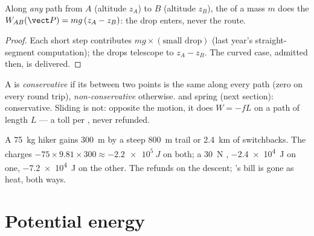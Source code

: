 \begin{proposition}\label{prop:g12:work-and-energy:weight}
Along \emph{any} path from $A$ (altitude $z_A$) to $B$ (altitude
$z_B$), the  of a mass $m$ does the 
$W_{AB}(\vect P) = mg\,(z_A - z_B)$: the drop enters, never the route.
\end{proposition}

\begin{proof}
Each short step contributes $mg \times (\text{small drop})$ (last
year's straight-segment computation); the drops telescope to
$z_A - z_B$. The curved case, admitted then, is delivered.
\end{proof}

\begin{definition}\label{def:g12:work-and-energy:conservative}
A  is \emph{conservative} if its 
between two points is the same along every path (zero on every round
trip), \emph{non-conservative}
otherwise.  and spring  (next section): conservative.
Sliding  is not: opposite the motion, it does $W = -fL$ on a
path of length $L$ --- a toll per , never refunded.
\end{definition}

\begin{example}\label{ex:g12:work-and-energy:trails}
A \qty{75}{kg} hiker gains \qty{300}{m} by a steep \qty{800}{m} trail
or \qty{2.4}{km} of switchbacks. The  charges
$-75 \times 9.81 \times 300 \approx \qty{-2.2e5}{J}$ on both; a
\qty{30}{N}  , \qty{-2.4e4}{J} on one, \qty{-7.2e4}{J}
on the other. The  refunds on the descent; 's bill is
gone as heat, both ways.
\end{example}

\section{Potential energy}

